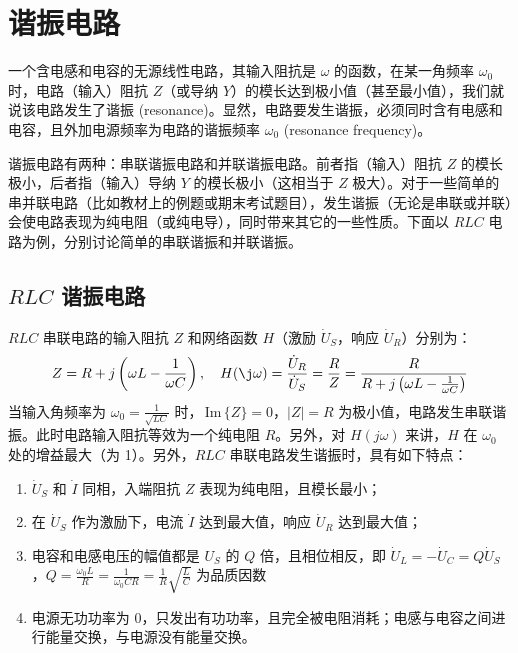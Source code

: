 \documentclass[UTF8]{report}
\def\Im{\,\mathrm{Im}\,}
\theoremstyle{MyLineTheoremStyle} %
\theoremstyle{MyBlockTheoremStyle} %
\theoremstyle{MySubsubsectionStyle} %
\begin{document}
\section{谐振电路}
一个含电感和电容的无源线性电路，其输入阻抗是 $\omega$ 的函数，在某一角频率 $\omega_0$ 时，电路（输入）阻抗 $Z$（或导纳 $Y$）的模长达到极小值（甚至最小值），我们就说该电路发生了谐振 (resonance)。显然，电路要发生谐振，必须同时含有电感和电容，且外加电源频率为电路的谐振频率 $\omega_0$ (resonance frequency)。


谐振电路有两种：串联谐振电路和并联谐振电路。前者指（输入）阻抗 $Z$ 的模长极小，后者指（输入）导纳 $Y$ 的模长极小（这相当于 $Z$ 极大）。对于一些简单的串并联电路（比如教材上的例题或期末考试题目），发生谐振（无论是串联或并联）会使电路表现为纯电阻（或纯电导），同时带来其它的一些性质。下面以 $RLC$ 电路为例，分别讨论简单的串联谐振和并联谐振。

\subsection{$RLC$ 谐振电路}
$RLC$ 串联电路的输入阻抗 $Z$ 和网络函数 $H$（激励 $\dot{U}_S$，响应 $\dot{U}_{R}$）分别为：
\begin{equation}
Z = R + j \left(\omega L - \frac{1}{\omega C}\right),\quad 
H(\j\omega) = \frac{\dot{U}_R}{\dot{U}_S} = \frac{R}{Z} = \frac{R}{R + j \left(\omega L - \frac{1}{\omega C}\right)}
\end{equation}
当输入角频率为 $\omega_0 = \frac{1}{\sqrt{LC}}$ 时，$\Im \{Z\} = 0$，$|Z| = R$ 为极小值，电路发生串联谐振。此时电路输入阻抗等效为一个纯电阻 $R$。另外，对 $H(j\omega)$ 来讲，$H$ 在 $\omega_0$ 处的增益最大（为 1）。另外，$RLC$ 串联电路发生谐振时，具有如下特点：
\begin{enumerate}
\item $\dot{U}_S$ 和 $\dot{I}$ 同相，入端阻抗 $Z$ 表现为纯电阻，且模长最小；
\item 在 $\dot{U}_S$ 作为激励下，电流 $\dot{I}$ 达到最大值，响应 $\dot{U}_R$ 达到最大值；
\item 电容和电感电压的幅值都是 $U_S$ 的 $Q$ 倍，且相位相反，即 $\dot{U}_L = -\dot{U}_C = Q \dot{U}_S$，$Q = \frac{\omega_0 L}{R} = \frac{1}{\omega_0 CR} = \frac{1}{R}\sqrt{\frac{L}{C}}$ 为品质因数
\item 电源无功功率为 0，只发出有功功率，且完全被电阻消耗；电感与电容之间进行能量交换，与电源没有能量交换。
\end{enumerate}
\end{document}
